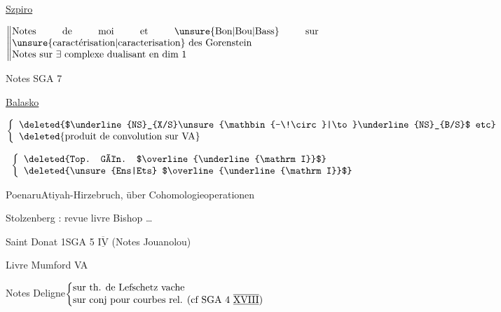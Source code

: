 \uline{Szpiro}

\(\left\Vert\begin{array}{@{}p{.91\linewidth}@{}}Notes de moi et \unsure{Bon|Bou|Bass} sur \unsure{caractérisation|caracterisation} des Gorenstein\\Notes sur $\exists$ complexe dualisant en dim 1\end{array}\right.\)

Notes SGA 7




\uline{Balasko}

\quad\(\left\{\begin{array}{l}\text{\deleted{$\underline{NS}_{X/S}\unsure{\mathbin{-\!\circ}|\to}\underline{NS}_{B/S}$ etc}}\\\text{\deleted{produit de convolution sur VA}}\end{array}\right.\)




\qquad {}\ \(\left\{\begin{array}{l}\text{\deleted{Top. Gén. $\overline{\underline{\mathrm I}}$}}\\\text{\deleted{\unsure{Ens|Ets} $\overline{\underline{\mathrm I}}$}}\end{array}\right.\)

Poenaru\qquad Atiyah-Hirzebruch, über Cohomologieoperationen\unsure{-|\ldots} \unsure{---|\ldots}

Stolzenberg : revue livre Bishop \ldots



Saint Donat 1\qquad SGA 5 $\overline{\underline{\mathrm{IV}}}$ (Notes Jouanolou)


Livre Mumford VA

Notes Deligne\qquad \(\left\{\begin{array}{@{}p{.67\linewidth}@{}}sur th. de Lefschetz vache\\sur conj pour courbes rel. (cf SGA 4 $\overline{\underline{\mathrm{XVIII}}}$)\end{array}\right.\)

\clearpage
